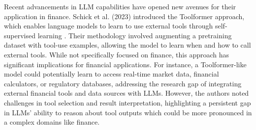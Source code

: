 \documentclass[logo,msc]{infthesis}           %
\begin{document}
Recent advancements in LLM capabilities have opened new avenues for their application in finance. Schick et al. (2023) introduced the Toolformer approach, which enables language models to learn to use external tools through self-supervised learning \cite{schick2023toolformer}. Their methodology involved augmenting a pretraining dataset with tool-use examples, allowing the model to learn when and how to call external tools. While not specifically focused on finance, this approach has significant implications for financial applications. For instance, a Toolformer-like model could potentially learn to access real-time market data, financial calculators, or regulatory databases, addressing the research gap of integrating external financial tools and data sources with LLMs. However, the authors noted challenges in tool selection and result interpretation, highlighting a persistent gap in LLMs' ability to reason about tool outputs which could be more pronounced in a complex domains like finance.
\end{document}
